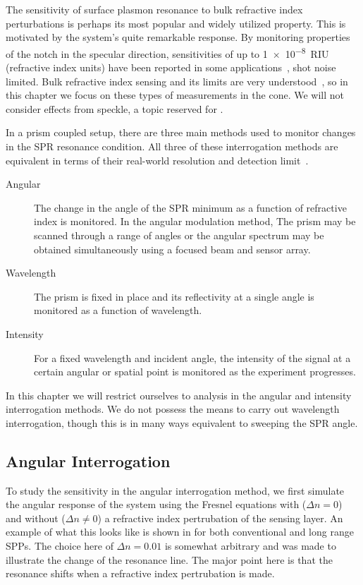 The sensitivity of surface plasmon resonance to bulk refractive index
perturbations is perhaps its most popular and widely utilized property.
This is motivated by the system's quite remarkable response. By monitoring
properties of the notch in the specular direction, sensitivities of up to
\SI{1e-8}{RIU} (refractive index units) have been reported in some
applications~\cite{fan2008sensitive}, shot noise limited.  Bulk refractive
index sensing and its limits are very
understood~\cite{piliarik2009surface}, so in this chapter we focus on these
types of measurements in the cone.  We will not consider effects from
speckle, a topic reserved for .  

In a prism coupled setup, there are three main methods used to
monitor changes in the SPR resonance condition.  All three of these
interrogation methods are equivalent in terms of their real-world
resolution and detection limit~\cite{homola2006surface}.
\begin{description}
	\item [{Angular}] The change in the angle of the SPR minimum as a function
					of refractive index is monitored.  In the angular modulation method,
					The prism may be scanned through a range of angles or the angular
					spectrum may be obtained simultaneously using a focused beam and
					sensor array.
 \item [{Wavelength}] The prism is fixed in place and its reflectivity at
  a single angle is monitored as a function of wavelength.
	\item [{Intensity}] For a fixed wavelength and incident angle, the
		intensity of the signal at a certain angular or spatial point is
		monitored as the experiment progresses.
\end{description}
In this chapter we will restrict ourselves to analysis in the angular and
intensity interrogation methods.  We do not possess the means to carry out
wavelength interrogation, though this is in many ways equivalent to
sweeping the SPR angle. 

\subsection{Angular Interrogation}
To study the sensitivity in the angular interrogation method, we first
simulate the angular response of the system using the Fresnel equations
with ($\Delta n = 0$) and without ($\Delta n \ne 0$) a refractive index
pertrubation of the sensing layer.  An example of what this looks like is
shown in  for both conventional and long range
SPPs.  The choice here of 
$\Delta n = 0.01$ is somewhat arbitrary and was made to 
illustrate the change of the resonance line.  The major point here is that
the resonance shifts when a refractive index pertrubation is made.

